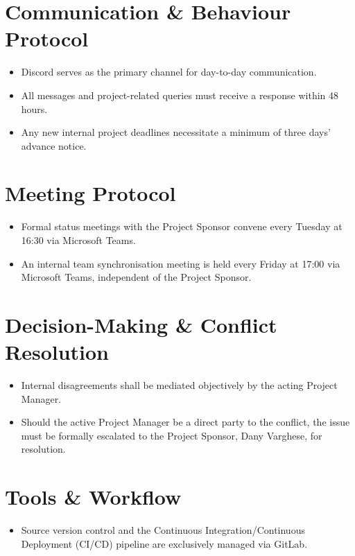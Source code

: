 \documentclass[11pt, a4paper]{report}
\begin{document}
\section{Communication \& Behaviour Protocol}
\begin{itemize}
    \item Discord serves as the primary channel for day-to-day communication.
    \item All messages and project-related queries must receive a response within 48 hours.
    \item Any new internal project deadlines necessitate a minimum of three days' advance notice.
\end{itemize}

\section{Meeting Protocol}
\begin{itemize}
    \item Formal status meetings with the Project Sponsor convene every Tuesday at 16:30 via Microsoft Teams.
    \item An internal team synchronisation meeting is held every Friday at 17:00 via Microsoft Teams, independent of the Project Sponsor.
\end{itemize}

\section{Decision-Making \& Conflict Resolution}
\begin{itemize}
    \item Internal disagreements shall be mediated objectively by the acting Project Manager.
    \item Should the active Project Manager be a direct party to the conflict, the issue must be formally escalated to the Project Sponsor, Dany Varghese, for resolution.
\end{itemize}

\section{Tools \& Workflow}
\begin{itemize}
    \item Source version control and the Continuous Integration/Continuous Deployment (CI/CD) pipeline are exclusively managed via GitLab.
\end{itemize}
\end{document}
